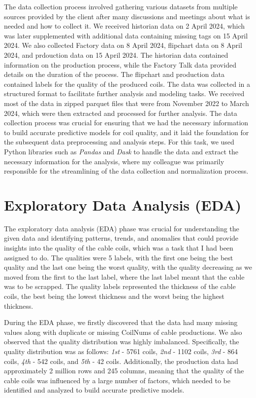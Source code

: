 The data collection process involved gathering various datasets from multiple
sources provided by the client after many discussions and meetings about what
is needed and how to collect it. We received historian data on 2 April 2024,
which was later supplemented with additional data containing missing tags on 15
April 2024. We also collected Factory data on 8 April 2024, flipchart data on 8
April 2024, and prdouction data on 15 April 2024. The historian data contained
information on the production process, while the Factory Talk data provided
details on the duration of the process. The flipchart and production data
contained labels for the quality of the produced coils. The data was collected
in a structured format to facilitate further analysis and modeling tasks. We
received most of the data in zipped parquet files that were from November 2022
to March 2024, which were then extracted and processed for further analysis.
The data collection process was crucial for ensuring that we had the necessary
information to build accurate predictive models for coil quality, and it laid
the foundation for the subsequent data preprocessing and analysis steps. For
this task, we used Python libraries such as \emph{Pandas} and \emph{Dask} to
handle the data and extract the necessary information for the analysis, where
my colleague was primarily responsible for the streamlining of the data
collection and normalization process.

\section{Exploratory Data Analysis (EDA)}

The exploratory data analysis (EDA) phase was crucial for understanding the
given data and identifying patterns, trends, and anomalies that could provide
insights into the quality of the cable coils, which was a task that I had been
assigned to do. The qualities were 5 labels, with the first one being the best
quality and the last one being the worst quality, with the quality decreasing
as we moved from the first to the last label, where the last label meant that
the cable was to be scrapped. The quality labels represented the thickness of
the cable coils, the best being the lowest thickness and the worst being the
highest thickness.

During the EDA phase, we firstly discovered that the data had many missing
values along with duplicate or missing CoilNums of cable productions. We also
observed that the quality distribution was highly imbalanced. Specifically, the
quality distribution was as follows: \emph{1st} - 5761 coils, \emph{2nd} - 1102
coils, \emph{3rd} - 864 coils, \emph{4th} - 542 coils, and \emph{5th} - 42
coils. Additionally, the production data had approximately 2 million rows and
245 columns, meaning that the quality of the cable coils was influenced by a
large number of factors, which needed to be identified and analyzed to build
accurate predictive models.

